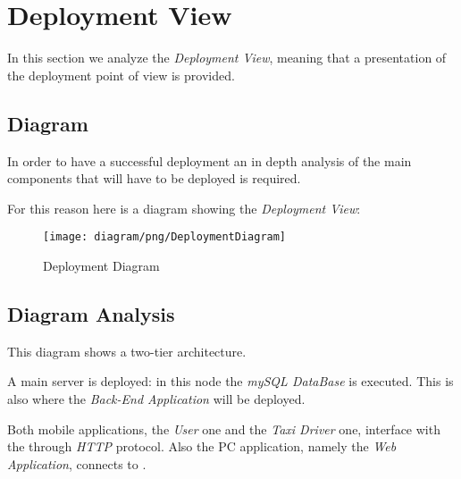 \newpage

\section{Deployment View} %
\label{sec:deployment_view}

In this section we analyze the \emph{Deployment View}, meaning that a presentation of the deployment point of view is provided.

\subsection{Diagram} %
\label{ssub:diagram}

In order to have a successful deployment an in depth analysis of the main components that will have to be deployed is required.

For this reason here is a diagram showing the \emph{Deployment View}:

\begin{figure}[h!t]
\caption{Deployment Diagram}
\texttt{[image: diagram/png/DeploymentDiagram]}
\centering
\end{figure}
\newpage


\subsection{Diagram Analysis} %
\label{ssub:diagram_analysis}

This diagram shows a two-tier architecture.

A main server is deployed: in this node the \emph{mySQL DataBase} is executed. This is also where the \emph{Back-End Application} will be deployed.

Both mobile applications, the \emph{User} one and the \emph{Taxi Driver} one, interface with the \emph{} through \emph{HTTP} protocol.
Also the PC application, namely the \emph{Web Application}, connects to \emph{}.
